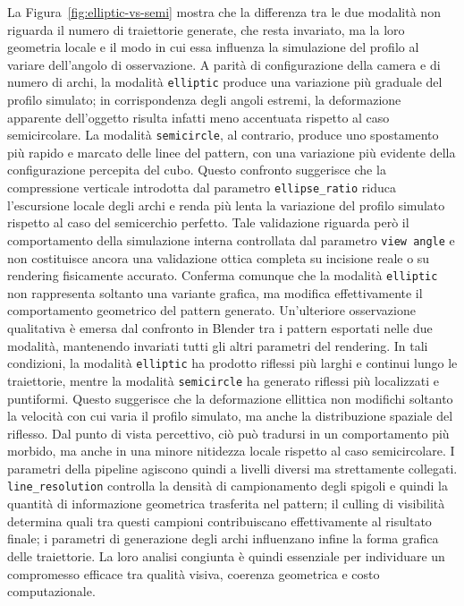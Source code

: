 \documentclass[a4paper,11pt,titlepage,twoside]{book}
\newcommand{\1}{\mathbf{1}}
\numberwithin{equation}{chapter}
\theoremstyle{plain}
\theoremstyle{definition}
\begin{document}
	La Figura~\ref{fig:elliptic-vs-semi} mostra che la differenza tra le due modalità non riguarda il numero di traiettorie generate, che resta invariato, ma la loro geometria locale e il modo in cui essa influenza la simulazione del profilo al variare dell’angolo di osservazione. A parità di configurazione della camera e di numero di archi, la modalità \texttt{elliptic} produce una variazione più graduale del profilo simulato; in corrispondenza degli angoli estremi, la deformazione apparente dell’oggetto risulta infatti meno accentuata rispetto al caso semicircolare. La modalità \texttt{semicircle}, al contrario, produce uno spostamento più rapido e marcato delle linee del pattern, con una variazione più evidente della configurazione percepita del cubo.
	Questo confronto suggerisce che la compressione verticale introdotta dal parametro \texttt{ellipse\_ratio} riduca l’escursione locale degli archi e renda più lenta la variazione del profilo simulato rispetto al caso del semicerchio perfetto. Tale validazione riguarda però il comportamento della simulazione interna controllata dal parametro \texttt{view angle} e non costituisce ancora una validazione ottica completa su incisione reale o su rendering fisicamente accurato. Conferma comunque che la modalità \texttt{elliptic} non rappresenta soltanto una variante grafica, ma modifica effettivamente il comportamento geometrico del pattern generato.
	Un’ulteriore osservazione qualitativa è emersa dal confronto in Blender tra i pattern esportati nelle due modalità, mantenendo invariati tutti gli altri parametri del rendering. In tali condizioni, la modalità \texttt{elliptic} ha prodotto riflessi più larghi e continui lungo le traiettorie, mentre la modalità \texttt{semicircle} ha generato riflessi più localizzati e puntiformi. Questo suggerisce che la deformazione ellittica non modifichi soltanto la velocità con cui varia il profilo simulato, ma anche la distribuzione spaziale del riflesso. Dal punto di vista percettivo, ciò può tradursi in un comportamento più morbido, ma anche in una minore nitidezza locale rispetto al caso semicircolare.
	I parametri della pipeline agiscono quindi a livelli diversi ma strettamente collegati. \texttt{line\_resolution} controlla la densità di campionamento degli spigoli e quindi la quantità di informazione geometrica trasferita nel pattern; il culling di visibilità determina quali tra questi campioni contribuiscano effettivamente al risultato finale; i parametri di generazione degli archi influenzano infine la forma grafica delle traiettorie. La loro analisi congiunta è quindi essenziale per individuare un compromesso efficace tra qualità visiva, coerenza geometrica e costo computazionale.
	
\end{document}
